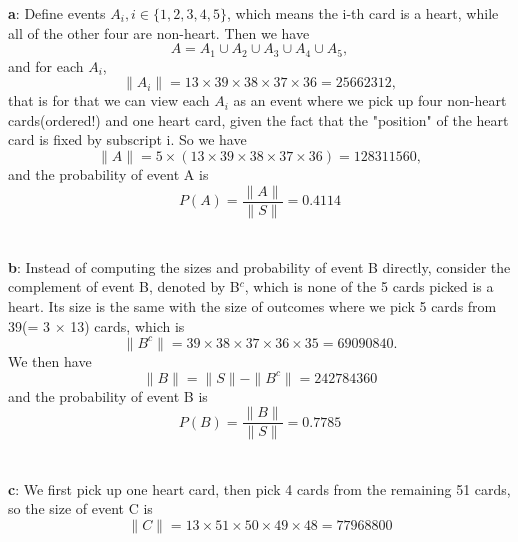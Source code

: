 \documentclass[12pt,letterpaper]{article}
\begin{document}
    \textbf{a}: Define events $A_i, i \in \{1, 2, 3, 4, 5\}$, which means the i-th card is a heart, while all of the other four are non-heart. Then we have
        \begin{equation}
            A = A_1 \cup A_2 \cup A_3 \cup A_4 \cup A_5,
        \end{equation}
    and for each $A_i$,
        \begin{equation}
            \|A_i\| = 13 \times 39 \times 38 \times 37 \times 36 = 25662312,
        \end{equation}
    that is for that we can view each $A_i$ as an event where we pick up four non-heart cards(ordered!) and one heart card, given the fact that the "position" of the heart card is fixed by subscript i. So we have
        \begin{equation}
            \|A\| = 5 \times (13 \times 39 \times 38 \times 37 \times 36) = 128311560,
        \end{equation}
    and the probability of event A is
        \begin{equation}
            P(A) = \frac{\|A\|}{\|S\|} = 0.4114
        \end{equation}
    \\ \\
    \textbf{b}: Instead of computing the sizes and probability of event B directly, consider the complement of event B, denoted by B$^c$, which is {none of the 5 cards picked is a heart}. Its size is the same with the size of outcomes where we pick 5 cards from 39(= 3 $\times$ 13) cards, which is
        \begin{equation}
            \|B^c\| = 39 \times 38 \times 37 \times 36 \times 35 = 69090840.
        \end{equation}
    We then have
        \begin{equation}
            \|B\| = \|S\| - \|B^c\| = 242784360
        \end{equation}
    and the probability of event B is
        \begin{equation}
            P(B) = \frac{\|B\|}{\|S\|} = 0.7785
        \end{equation}
    \\ \\
    \textbf{c}: We first pick up one heart card, then pick 4 cards from the remaining 51 cards, so the size of event C is
        \begin{equation}
            \|C\| = 13 \times 51 \times 50 \times 49 \times 48 = 77968800
        \end{equation}
\end{document}
